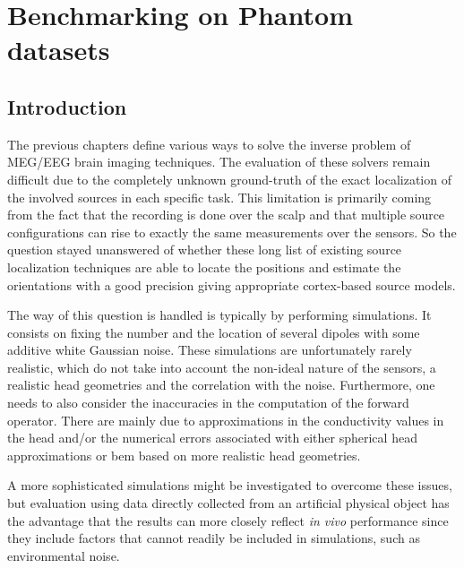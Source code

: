 
\chapter{Benchmarking on Phantom datasets}
\label{chapter:benchmark}
\noindent\makebox[\linewidth]{\rule{0.75\paperwidth}{0.4pt}}
\noindent\makebox[\linewidth]{\rule{0.75\paperwidth}{0.4pt}}

\localtableofcontents %

\noindent\makebox[\linewidth]{\rule{0.75\paperwidth}{0.4pt}}
\noindent\makebox[\linewidth]{\rule{0.75\paperwidth}{0.4pt}}
\newpage

\section{Introduction}
The previous chapters define various ways to solve the inverse problem of MEG/EEG brain imaging techniques. The evaluation of these solvers remain difficult due to the completely unknown ground-truth of the exact localization of the involved sources in each specific task. This limitation is primarily coming from the fact that the recording is done over the scalp and that multiple source configurations can rise to exactly the same measurements over the sensors. So the question stayed unanswered of whether these long list of existing source localization techniques are able to locate the positions and estimate the orientations with a good precision giving appropriate cortex-based source models.

The way of this question is handled is typically by performing simulations. It consists on fixing the number and the location of several dipoles with some additive white Gaussian noise. These simulations are unfortunately rarely realistic, which do not take into account the non-ideal nature of the sensors, a realistic head geometries and the correlation with the noise. Furthermore, one needs to also consider the inaccuracies in the computation of the forward operator. There are mainly due to approximations in the conductivity values in the head and/or the numerical errors associated with either spherical head approximations or \ac{bem} based on more realistic head geometries. 

A more sophisticated simulations might be investigated to overcome these issues, but evaluation using data directly collected from an artificial physical object has the advantage that the results can more closely reflect \textit{in vivo} performance since they include factors that cannot readily be included in simulations, such as environmental noise. 

